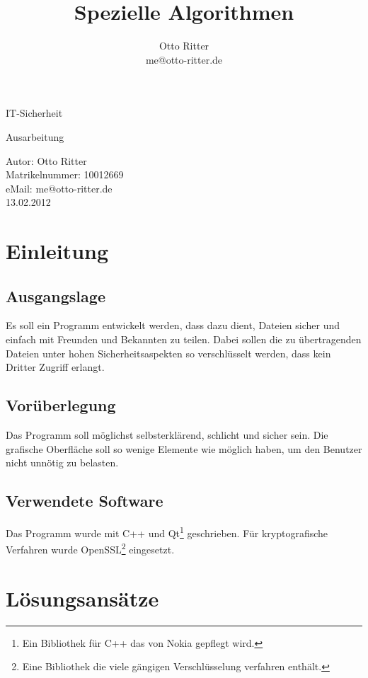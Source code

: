 \documentclass[12pt,a4paper,titlepage]{article}
\author{Otto Ritter\\me@otto-ritter.de}
\title{Spezielle Algorithmen}
\begin{document}

\begin{titlepage} 
\begin{center}
\begin{Huge}
IT-Sicherheit\\
\end{Huge}
\vspace*{0,5cm}
\begin{Large}
Ausarbeitung\\
\end{Large}
\vspace*{1,2cm}
Autor: Otto Ritter\\
Matrikelnummer: 10012669\\
eMail: me@otto-ritter.de\\
\vspace{1cm}
13.02.2012
\end{center}
\end{titlepage}
\newpage
\tableofcontents
\thispagestyle{empty}
\nocite{*}
\newpage
\setcounter{page}{1}
\section{Einleitung}
\subsection{Ausgangslage}
Es soll ein Programm entwickelt werden, dass dazu dient, Dateien sicher und einfach mit Freunden und Bekannten zu teilen. Dabei sollen die zu übertragenden Dateien unter hohen Sicherheitsaspekten so verschlüsselt werden, dass kein Dritter Zugriff erlangt.
\subsection{Vorüberlegung}
Das Programm soll möglichst selbsterklärend, schlicht und sicher sein. Die grafische Oberfläche soll so wenige Elemente wie möglich haben, um den Benutzer nicht unnötig zu belasten.
\subsection{Verwendete Software}
Das Programm wurde mit C++ und Qt\footnote{Ein Bibliothek für C++ das von Nokia gepflegt wird.} geschrieben. Für kryptografische Verfahren wurde OpenSSL\footnote{Eine Bibliothek die viele gängigen Verschlüsselung verfahren enthält.} eingesetzt.
\section{Lösungsansätze}
\end{document}
